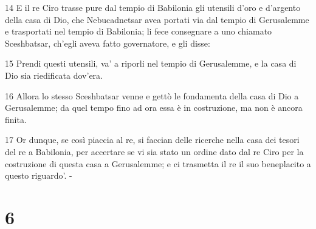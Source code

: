 \par 14 E il re Ciro trasse pure dal tempio di Babilonia gli utensili d'oro e d'argento della casa di Dio, che Nebucadnetsar avea portati via dal tempio di Gerusalemme e trasportati nel tempio di Babilonia; li fece consegnare a uno chiamato Sceshbatsar, ch'egli aveva fatto governatore, e gli disse:
\par 15 Prendi questi utensili, va' a riporli nel tempio di Gerusalemme, e la casa di Dio sia riedificata dov'era.
\par 16 Allora lo stesso Sceshbatsar venne e gettò le fondamenta della casa di Dio a Gerusalemme; da quel tempo fino ad ora essa è in costruzione, ma non è ancora finita.
\par 17 Or dunque, se così piaccia al re, si faccian delle ricerche nella casa dei tesori del re a Babilonia, per accertare se vi sia stato un ordine dato dal re Ciro per la costruzione di questa casa a Gerusalemme; e ci trasmetta il re il suo beneplacito a questo riguardo'. -

\chapter{6}

